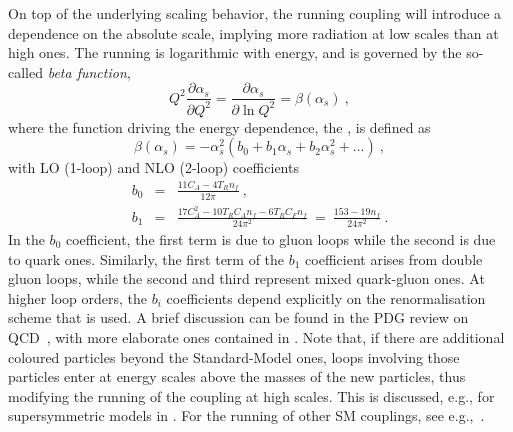 %
On top of the underlying scaling behavior, the running coupling will
introduce a dependence on the absolute scale, implying more radiation
at low scales than at high ones. The running is logarithmic with
%
energy, and is governed by the so-called \emph{beta function}, 
\begin{equation}
Q^2 \frac{\partial \alpha_s}{\partial Q^2} = \frac{\partial
  \alpha_s}{\partial \ln Q^2} =
\beta(\alpha_s)~, \label{eq:running}
\end{equation}
where the function driving the energy dependence, the , is defined as
\begin{equation}
\beta(\alpha_s) = -\alpha_s^2(b_0 +
b_1\alpha_s + b_2\alpha_s^2 + \ldots)~,\label{eq:beta}
\end{equation}
with LO (1-loop) and NLO (2-loop) coefficients
\begin{eqnarray}
b_0 & = & \frac{11C_A - 4 T_R n_f}{12\pi}~,\\[3mm]
b_1 & = & \frac{17C_A^2 - 10 T_R C_A n_f - 6 T_R C_F n_f}{24\pi^2} ~=~
\frac{153-19 n_f}{24\pi^2}~.\label{eq:b}
\end{eqnarray}
In the $b_0$ coefficient, the first term is due to
gluon loops while the
second is due to quark
ones. Similarly, the first 
term of the $b_1$ coefficient arises from double gluon loops,
while the second and third represent mixed quark-gluon ones. 
At higher loop orders, the $b_i$ coefficients depend explicitly on the
renormalisation scheme that is used. A brief discussion can be found in the
PDG review on QCD~\cite{pdg2012}, with more elaborate ones
contained in \cite{Dissertori:2003pj,Ellis:1991qj}. 
Note that, if there are additional coloured particles beyond the
Standard-Model ones, loops involving those particles enter
 at energy scales above the masses of the
new particles, thus modifying the  running of the coupling at high scales. 
This is discussed, e.g., for supersymmetric models in
\cite{Martin:1997ns}. For the running of other SM couplings, see
e.g.,~\cite{Langacker:2010zza}. 

